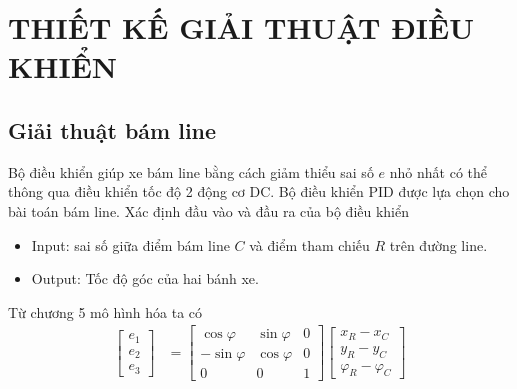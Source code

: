\chapter{THIẾT KẾ GIẢI THUẬT ĐIỀU KHIỂN}
     \section{Giải thuật bám line}
          \hspace*{0.6cm}Bộ điều khiển giúp xe bám line bằng cách giảm thiểu sai số $e$ nhỏ nhất có thể thông qua điều khiển tốc độ 2 động cơ DC. Bộ điều khiển PID được lựa chọn cho bài toán bám line.
          \newline
          \hspace*{0.6cm}Xác định đầu vào và đầu ra của bộ điều khiển
          \begin{itemize}
               \item Input: sai số giữa điểm bám line $C$ và điểm tham chiếu $R$ trên đường line.
               \item Output: Tốc độ góc của hai bánh xe.
          \end{itemize}
          \hspace*{0.6cm}Từ chương 5 mô hình hóa ta có
          \begin{align}
               \begin{bmatrix}
                    e_1 \\
                    e_2 \\
                    e_3
                    \end{bmatrix} &= \begin{bmatrix}
                    \cos\varphi & \sin \varphi & 0 \\
                    -\sin\varphi & \cos \varphi & 0 \\
                    0 & 0 & 1
                    \end{bmatrix} \begin{bmatrix}
                    x_R - x_C \\
                    y_R - y_C \\
                    \varphi_R - \varphi_C
               \end{bmatrix} 
               \label{c6_e1}
          \end{align}
